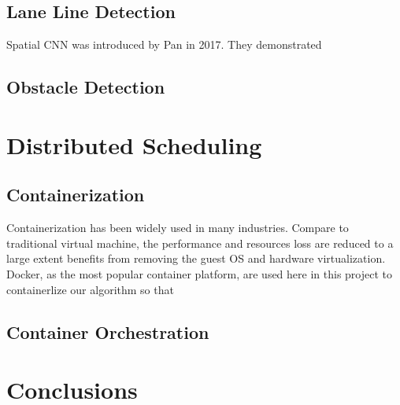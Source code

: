 \documentclass[runningheads]{llncs}
\begin{document}
\subsection{Lane Line Detection}

Spatial CNN was introduced by Pan in 2017. They 
demonstrated

\subsection{Obstacle Detection}


\section{Distributed Scheduling}

\subsection{Containerization}
Containerization has been widely used in many industries. 
Compare to traditional virtual machine, the performance 
and resources loss are reduced to a large extent benefits 
from removing the guest OS and hardware virtualization. 
Docker, as the most popular container platform, are used here
in this project to containerlize our algorithm so that 


\subsection{Container Orchestration}

\section{Conclusions}


\clearpage



\end{document}
